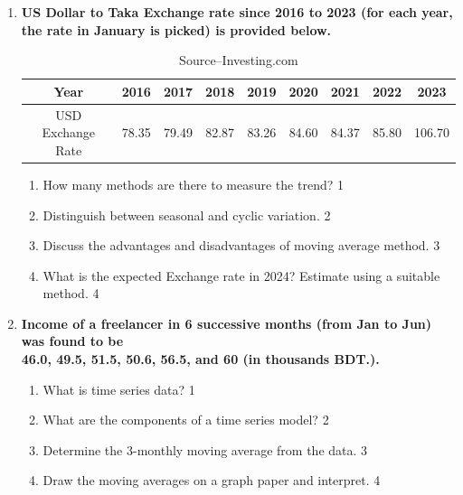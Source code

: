 \documentclass[a4paper,oneside]{book}
\begin{document}
\begin{enumerate}
\begin{enumerate}
  \begin{enumerate}
    \item
	What is semi-average method? \hfill 1
    \item
	Make a line chart from the data? \textcolor{red}{TO BE REVIEWED} \hfill 2
    \item  
	Find the trend of the data and explain. \hfill 3
    \item
	How can the person accomplish what he intends? \hfill 4
  \end{enumerate}
  
  \item
	  \textbf{US Dollar to Taka Exchange rate since 2016 to 2023 (for each year, the rate in January is picked) is provided below. } 
  
  \begin{table}[h]
  \centering
\begin{tabular}{c|c|c|c|c|c|c|c|c}
Year & 2016 & 2017 & 2018 & 2019 & 2020 & 2021 & 2022 & 2023 \\ \hline
USD Exchange Rate & 78.35 & 79.49 & 82.87 & 83.26 & 84.60 & 84.37 & 85.80 & 106.70
\end{tabular}
\caption{\label{usdrate}Source--Investing.com}
\end{table}
  
  
  \begin{enumerate}
    \item
	How many methods are there to measure the trend? \hfill 1
    \item
	Distinguish between seasonal and cyclic variation. \hfill 2
    \item  
	Discuss the advantages and disadvantages of moving average method. \hfill 3
    \item
	What is the expected Exchange rate in 2024? Estimate using a suitable method. \hfill 4
  \end{enumerate}

 \item
	  \textbf{Income of a freelancer in 6 successive months (from Jan to Jun) was found to be \\ 46.0, 49.5, 51.5, 50.6, 56.5, and 60 (in thousands BDT.).}
  \begin{enumerate}
    \item
	What is time series data? \hfill 1
    \item
	What are the components of a time series model? \hfill 2
    \item  
	Determine the 3-monthly moving average from the data. \hfill 3
    \item
	Draw the moving averages on a graph paper and interpret. \hfill 4
\end{enumerate}


\end{enumerate}
\end{enumerate}
\end{document}
